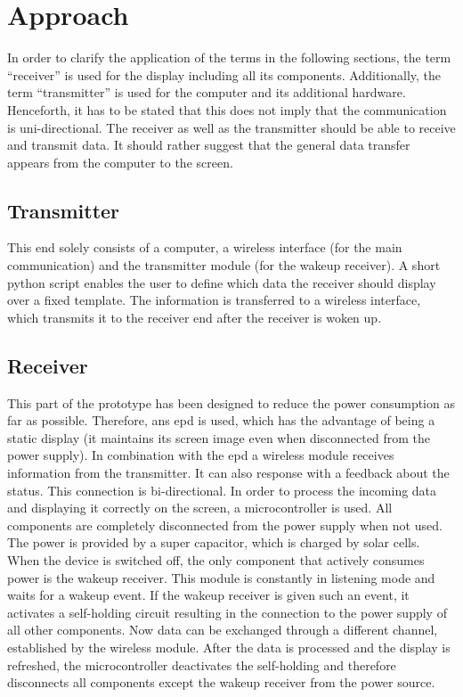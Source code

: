 \section{Approach}
In order to clarify the application of the terms in the following sections, the term “receiver” is used for the display including all its components. Additionally, the term “transmitter” is used for the computer and its additional hardware. Henceforth, it has to be stated that this does not imply that the communication is uni-directional. The receiver as well as the transmitter should be able to receive and transmit data. It should rather suggest that the general data transfer appears from the computer to the screen. 

\subsection{Transmitter}
This end solely consists of a computer, a wireless interface (for the main communication) and the transmitter module (for the wakeup receiver). A short python script enables the user to define which data the receiver should display over a fixed template. The information is transferred to a wireless interface, which transmits it to the receiver end after the receiver is woken up.

\subsection{Receiver}
This part of the prototype has been designed to reduce the power consumption as far as possible. Therefore, ans \acs{epd} is used, which has the advantage of being a static display (it maintains its screen image even when disconnected from the power supply). In combination with the \acs{epd} a wireless module receives information from the transmitter. It can also response with a feedback about the status. This connection is bi-directional. In order to process the incoming data and displaying it correctly on the screen, a microcontroller is used. All components  are completely disconnected from the power supply when not used. The power is provided by a super capacitor, which is charged by solar cells. When the device is switched off, the only component that actively consumes power is the wakeup receiver. This module is constantly in listening mode and waits for a wakeup event. If the wakeup receiver is given such an event, it activates a self-holding circuit resulting in the connection to the power supply of all other components. Now data can be exchanged through a different channel, established by the wireless module. After the data is processed and the display is refreshed, the microcontroller deactivates the self-holding and therefore disconnects all components except the wakeup receiver from the power source.